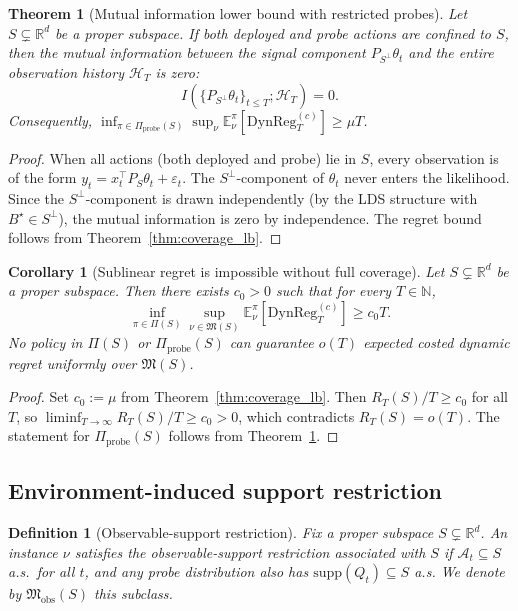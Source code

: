 \documentclass[12pt]{article}
\newcommand{\R}{\mathbb{R}}
\newcommand{\N}{\mathbb{N}}
\newcommand{\E}{\mathbb{E}}
\newcommand{\cA}{\mathcal{A}}
\newcommand{\cH}{\mathcal{H}}
\newcommand{\DynReg}{\mathrm{DynReg}}
\newcommand{\supp}{\mathrm{supp}}
\newtheorem{definition}{Definition}
\newtheorem{theorem}{Theorem}
\newtheorem{corollary}{Corollary}
\theoremstyle{plain}
\theoremstyle{definition}
\begin{document}
\begin{theorem}[Mutual information lower bound with restricted probes]
\label{thm:coverage_lb_probe}
Let $S \subsetneq \R^d$ be a proper subspace. If both deployed and probe actions are confined to $S$, then the mutual information between the signal component $P_{S^\perp}\theta_t$ and the entire observation history $\cH_T$ is zero:
\[
I(\{P_{S^\perp}\theta_t\}_{t \le T} ; \cH_T) = 0.
\]
Consequently, $\inf_{\pi \in \Pi_{\mathrm{probe}}(S)} \sup_\nu \E_\nu^\pi[\DynReg_T^{(c)}] \ge \mu T$.
\end{theorem}

\begin{proof}
When all actions (both deployed and probe) lie in $S$, every observation is of the form $y_t = x_t^\top P_S \theta_t + \varepsilon_t$. The $S^\perp$-component of $\theta_t$ never enters the likelihood. Since the $S^\perp$-component is drawn independently (by the LDS structure with $B^\star \in S^\perp$), the mutual information is zero by independence. The regret bound follows from Theorem~\ref{thm:coverage_lb}.
\end{proof}

\begin{corollary}[Sublinear regret is impossible without full coverage]
\label{cor:sublinear_impossible}
Let $S \subsetneq \R^d$ be a proper subspace. Then there exists $c_0 > 0$ such that for every $T \in \N$,
\[
\inf_{\pi \in \Pi(S)} \sup_{\nu \in \mathfrak{M}(S)} \E_\nu^\pi[\DynReg_T^{(c)}] \ge c_0 T.
\]
No policy in $\Pi(S)$ or $\Pi_{\mathrm{probe}}(S)$ can guarantee $o(T)$ expected costed dynamic regret uniformly over $\mathfrak{M}(S)$.
\end{corollary}

\begin{proof}
Set $c_0 := \mu$ from Theorem~\ref{thm:coverage_lb}. Then $R_T(S) / T \ge c_0$ for all $T$, so $\liminf_{T \to \infty} R_T(S)/T \ge c_0 > 0$, which contradicts $R_T(S) = o(T)$. The statement for $\Pi_{\mathrm{probe}}(S)$ follows from Theorem~\ref{thm:coverage_lb_probe}.
\end{proof}

\subsection{Environment-induced support restriction}

\begin{definition}[Observable-support restriction]
\label{def:obs_support}
Fix a proper subspace $S \subsetneq \R^d$. An instance $\nu$ satisfies the observable-support restriction associated with $S$ if $\cA_t \subseteq S$ a.s.\ for all $t$, and any probe distribution also has $\supp(Q_t) \subseteq S$ a.s. We denote by $\mathfrak{M}_{\mathrm{obs}}(S)$ this subclass.
\end{definition}
\end{document}
